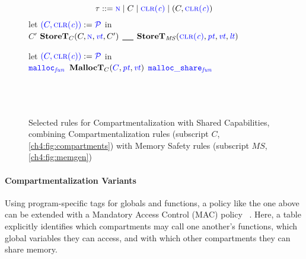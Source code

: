 \begin{figure}[t]
  \scriptsize  
  \color{blue}
  \begin{minipage}{0.45\textwidth}
    \center
    \[\tau ::= \N \mid C \mid \clr \mid (C,\clr)\]
    \storetruleblock
        {let  \({\color{blue}(C,\clr)} := \PCT\) in \\
          \caseoftwo{\(\lt\)}
                    {\color{blue} \(C'\)}{\color{blue} \(\mathbf{StoreT}_C(C,\N,\vt,C')\)}
                    {\underline{~ ~}}{\color{blue} \(\mathbf{StoreT}_{\mathit{MS}}(\clr,\pt,\vt,\lt)\)}}
  \end{minipage}
  \begin{minipage}{0.54\textwidth}
    \scriptsize
    \malloctruleblock
      {let \({\color{blue} (C,\clr)} := \PCT\) in \\
        \caseoftwo{\(\pt\)}
                  {\(\FN[malloc]\)}{\color{blue} \(\mathbf{MallocT}_{C}({\color{blue} C},\pt,\vt)\)}
                  {\(\FN[malloc\_share]\)}
                  {\\ \\
                     \\
                     \\}
      }
  \end{minipage}
  
  \caption{Selected rules for Compartmentalization with Shared Capabilities, combining Compartmentalization rules (subscript \(C\), \cref{ch4:fig:compartments}) with Memory Safety rules (subscript \(\mathit{MS}\), \cref{ch4:fig:memgen})}
  \label{ch4:fig:sharing}
\end{figure}

\paragraph*{Compartmentalization Variants}

Using program-specific tags for globals and functions, a policy
like the one above can be extended with a Mandatory Access Control (MAC) policy
~\cite{Lampson74:Protection}.
Here, a table explicitly identifies which compartments may call one another's functions,
which global variables they can access, and with which other compartments they can share
memory.

